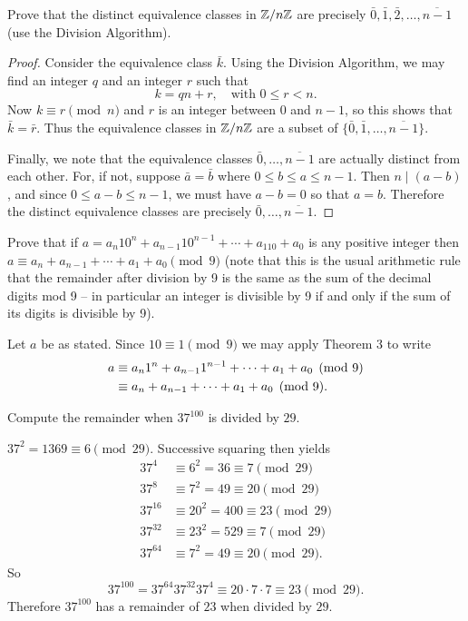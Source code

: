  Prove that the distinct equivalence classes in $\mathbb{Z}/n\mathbb{Z}$ are
precisely $\bar{0}, \bar{1}, \bar{2}, \ldots, \overline{n - 1}$ (use
the Division Algorithm).
\begin{proof}
  Consider the equivalence class $\bar k$. Using the Division
  Algorithm, we may find an integer $q$ and an integer $r$ such that
  \begin{equation*}
    k = qn + r,\quad\text{with $0\leq r<n$.}
  \end{equation*}
  Now $k\equiv r\pmod n$ and $r$ is an integer between $0$ and
  $n - 1$, so this shows that $\bar k = \bar r$. Thus the equivalence
  classes in $\mathbb{Z}/n\mathbb{Z}$ are a subset of
  $\{\bar{0}, \bar{1}, \ldots, \overline{n-1}\}$.

  Finally, we note that the equivalence classes
  $\bar0, \ldots, \overline{n-1}$ are actually distinct from each
  other. For, if not, suppose $\bar a = \bar b$ where
  $0\leq b\leq a\leq n-1$. Then $n\mid(a - b)$, and since
  $0\leq a-b\leq n-1$, we must have $a-b = 0$ so that $a =
  b$. Therefore the distinct equivalence classes are precisely
  $\bar0,\ldots,\overline{n-1}$.
\end{proof}

 Prove that if
$a = a_n10^n + a_{n-1}10^{n-1} + \cdots + a_110 + a_0$ is any positive
integer then $a\equiv a_n + a_{n-1} + \cdots + a_1 + a_0\pmod9$ (note
that this is the usual arithmetic rule that the remainder after
division by 9 is the same as the sum of the decimal digits mod 9 -- in
particular an integer is divisible by 9 if and only if the sum of its
digits is divisible by 9).
\begin{solution}
  Let $a$ be as stated. Since $10\equiv1\pmod9$ we may apply Theorem 3
  to write
  \begin{align*}
    a &\equiv a_n1^n + a_{n-1}1^{n-1} + \cdots + a_1 + a_0\pmod9 \\
      &\equiv a_n + a_{n-1} + \cdots + a_1 + a_0\pmod9. \qedhere
  \end{align*}
\end{solution}

 Compute the remainder when $37^{100}$ is divided by $29$.
\begin{solution}
  $37^2 = 1369\equiv6\pmod{29}$. Successive squaring then yields
  \begin{align*}
    37^4 &\equiv 6^2 = 36 \equiv 7\pmod{29} \\
    37^8 &\equiv 7^2 = 49 \equiv 20\pmod{29} \\
    37^{16} &\equiv 20^2 = 400 \equiv 23\pmod{29} \\
    37^{32} &\equiv 23^2 = 529 \equiv 7\pmod{29} \\
    37^{64} &\equiv 7^2 = 49 \equiv 20\pmod{29}.
  \end{align*}
  So
  \begin{equation*}
    37^{100} = 37^{64}37^{32}37^4 \equiv 20\cdot7\cdot7 \equiv 23\pmod{29}.
  \end{equation*}
  Therefore $37^{100}$ has a
  remainder of $23$ when divided by $29$.
\end{solution}

